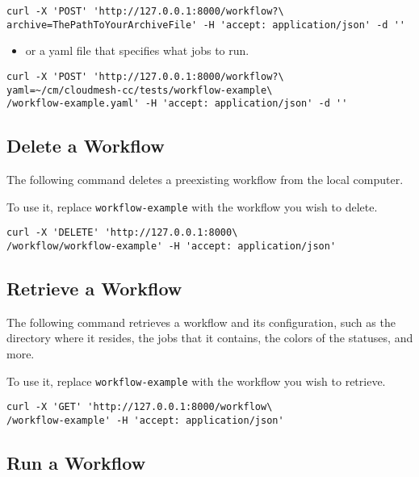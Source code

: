 \begin{verbatim}
curl -X 'POST' 'http://127.0.0.1:8000/workflow?\ 
archive=ThePathToYourArchiveFile' -H 'accept: application/json' -d ''
\end{verbatim}
\bigbreak

\bigbreak
\begin{itemize}
\item
  or a yaml file that specifies what jobs to run.
\end{itemize}

\begin{verbatim}
curl -X 'POST' 'http://127.0.0.1:8000/workflow?\
yaml=~/cm/cloudmesh-cc/tests/workflow-example\
/workflow-example.yaml' -H 'accept: application/json' -d ''
\end{verbatim}
\bigbreak

\subsection{Delete a Workflow}\label{delete-a-workflow}

The following command deletes a preexisting workflow from the local
computer.

To use it, replace \texttt{workflow-example} with the workflow you wish
to delete.

\begin{verbatim}
curl -X 'DELETE' 'http://127.0.0.1:8000\
/workflow/workflow-example' -H 'accept: application/json'
\end{verbatim}

\subsection{Retrieve a Workflow}\label{retrieve-a-workflow}

The following command retrieves a workflow and its configuration, such
as the directory where it resides, the jobs that it contains, the colors
of the statuses, and more.

To use it, replace \texttt{workflow-example} with the workflow you wish
to retrieve.

\begin{verbatim}
curl -X 'GET' 'http://127.0.0.1:8000/workflow\
/workflow-example' -H 'accept: application/json'
\end{verbatim}

\subsection{Run a Workflow}\label{run-a-workflow}

